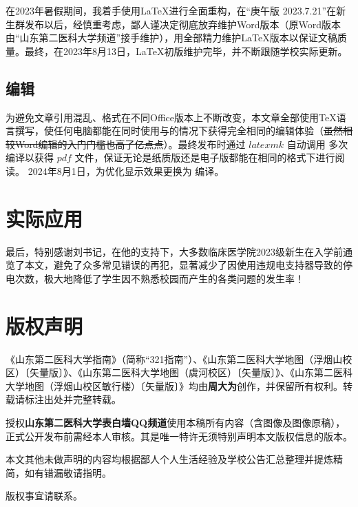 在2023年暑假期间，我着手使用\LaTeX 进行全面重构，在“庚午版 2023.7.21”在新生群发布以后，经慎重考虑，鄙人谨决定彻底放弃维护Word版本（原Word版本由“山东第二医科大学频道”接手维护），用全部精力维护LaTeX版本以保证文稿质量。最终，在2023年8月13日，LaTeX初版维护完毕，并不断跟随学校实际更新。

\subsection[编辑]{编辑}
为避免文章引用混乱、格式在不同Office版本上不断改变，本文章全部使用\TeX 语言撰写，使任何电脑都能在同时使用与\footnotemark 的情况下获得完全相同的编辑体验（\sout{虽然相较Word编辑的入门门槛也高了亿点点}）。最终发布时通过 $latexmk$ 自动调用 \XeLaTeX 多次编译以获得 $pdf$ 文件，保证无论是纸质版还是电子版都能在相同的格式下进行阅读。
2024年8月1日，为优化显示效果更换为 \LuaLaTeX 编译。

\section[实际应用]{实际应用}
最后，特别感谢刘书记，在他的支持下，大多数临床医学院2023级新生在入学前通览了本文，避免了众多常见错误的再犯，显著减少了因使用违规电支持器导致的停电次数，极大地降低了学生因不熟悉校园而产生的各类问题的发生率！

\section[版权声明]{版权声明}
\label{copyright}
《山东第二医科大学指南》（简称“321指南”）、《山东第二医科大学地图（浮烟山校区）〔矢量版〕》、《山东第二医科大学地图（虞河校区）〔矢量版〕》、《山东第二医科大学地图（浮烟山校区敏行楼）〔矢量版〕》均由\textbf{周大为}创作，并保留所有权利。转载请标注出处并完整转载。

授权\textbf{山东第二医科大学表白墙QQ频道}使用本稿所有内容（含图像及图像原稿），正式公开发布前需经本人审核。其是唯一特许无须特别声明本文版权信息的版本。

本文其他未做声明的内容均根据鄙人个人生活经验及学校公告汇总整理并提炼精简，如有错漏敬请指明。

版权事宜请联系。

